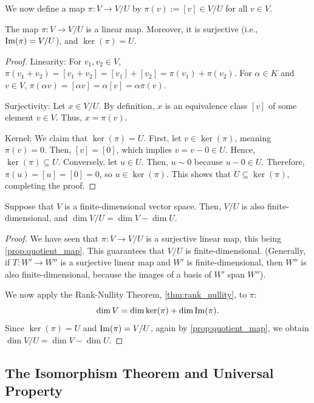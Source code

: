 We now define a map $\pi \colon V \to V/U$ by $\pi(v) := [v] \in V/U$ for all $v \in V$.

\begin{proposition}
  \label{prop:quotient_map}
  The map $\pi \colon V \to V/U$ is a linear map. Moreover, it is surjective (i.e., $\operatorname{Im}(\pi) = V/U$), and $\ker(\pi) = U$.
\end{proposition}

\begin{proof}
  Linearity: For $v_1, v_2 \in V$, $\pi(v_1 + v_2) = [v_1 + v_2] = [v_1] + [v_2] = \pi(v_1) + \pi(v_2)$. For $\alpha \in K$ and $v \in V$, $\pi(\alpha v) = [\alpha v] = \alpha [v] = \alpha \pi(v)$.

  Surjectivity: Let $x \in V/U$. By definition, $x$ is an equivalence class $[v]$ of some element $v \in V$. Thus, $x = \pi(v)$.

  Kernel: We claim that $\ker(\pi) = U$. First, let $v \in \ker(\pi)$, meaning $\pi(v) = 0$. Then, $[v] = [0]$, which implies $v = v - 0 \in U$. Hence, $\ker(\pi) \subseteq U$. Conversely, let $u \in U$. Then, $u \sim 0$ because $u - 0 \in U$. Therefore, $\pi(u) = [u] = [0] = 0$, so $u \in \ker(\pi)$. This shows that $U \subseteq \ker(\pi)$, completing the proof.
\end{proof}

\begin{proposition}
  \label{prop:dim_quotient}
  Suppose that $V$ is a finite-dimensional vector space. Then, $V/U$ is also finite-dimensional, and $\dim V/U = \dim V - \dim U$.
\end{proposition}

\begin{proof}
  We have seen that $\pi \colon V \to V/U$ is a surjective linear map, this being \cref{prop:quotient_map}. This guarantees that $V/U$ is finite-dimensional. (Generally, if $T \colon W' \to W''$ is a surjective linear map and $W'$ is finite-dimensional, then $W''$ is also finite-dimensional, because the images of a basis of $W'$ span $W''$).

  We now apply the Rank-Nullity Theorem, \cref{thm:rank_nullity}, to $\pi$:
  \[ \dim V = \dim \ker(\pi) + \dim \operatorname{Im}(\pi). \]
  Since $\ker(\pi) = U$ and $\operatorname{Im}(\pi) = V/U$, again by \cref{prop:quotient_map}, we obtain $\dim V/U = \dim V - \dim U$.
\end{proof}

\subsection{The Isomorphism Theorem and Universal Property}

